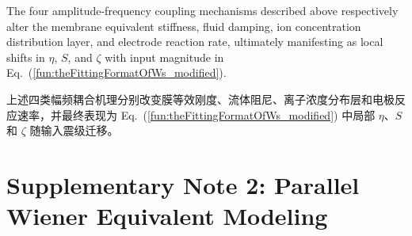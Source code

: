 \documentclass[sn-nature]{sn-jnl}
\newif\ifCNENEnglish
\newif\ifCNENBilingual
\newcommand{\CNEN}[2]{%
    \ifCNENBilingual
        #1%
        \if\relax\detokenize{#2}\relax\else\par #2\fi%
    \else
        \ifCNENEnglish
            #2%
        \else
            #1%
        \fi
    \fi
}
\newcommand{\fn}{\eta} %
\newcommand{\Sen}{S} %
\begin{document}
\CNEN{上述四类幅频耦合机理分别改变膜等效刚度、流体阻尼、离子浓度分布层和电极反应速率，并最终表现为 Eq.~(\ref{fun:theFittingFormatOfWs_modified}) 中局部 $\fn$、$\Sen$ 和 $\zeta$ 随输入震级迁移。}{The four amplitude-frequency coupling mechanisms described above respectively alter the membrane equivalent stiffness, fluid damping, ion concentration distribution layer, and electrode reaction rate, ultimately manifesting as local shifts in $\fn$, $\Sen$, and $\zeta$ with input magnitude in Eq.~(\ref{fun:theFittingFormatOfWs_modified}).%
}


\section{Supplementary Note 2: Parallel Wiener Equivalent Modeling}
\end{document}
